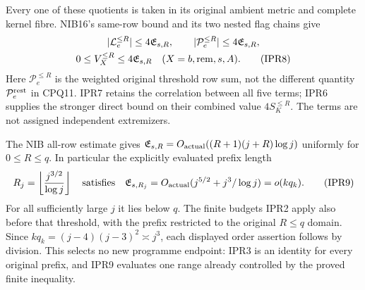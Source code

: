 \documentclass[11pt,a4paper]{article}
\begin{document}
Every one of these quotients is taken in its original ambient
metric and complete kernel fibre. NIB16's same-row bound and its
two nested flag chains give
\[
\begin{gathered}
 |\mathcal L_e^{\le R}|\le4\mathfrak E_{s,R},\qquad
 |\mathcal P_e^{\le R}|\le4\mathfrak E_{s,R},\\
 0\le V_X^{\le R}\le4\mathfrak E_{s,R}
           \quad(X=b,{\rm rem},s,A).                   \tag{IPR8}
\end{gathered}
\]
Here $\mathcal P_e^{\le R}$ is the weighted original threshold
row sum, not the different quantity $\mathcal P_e^{\rm rest}$
in CPQ11. IPR7 retains the correlation between all five terms;
IPR6 supplies the stronger direct bound on their combined value
$4S_K^{\le R}$. The terms are not assigned independent extremizers.

The NIB all-row estimate gives
$\mathfrak E_{s,R}=O_{\rm actual}((R+1)(j+R)\log j)$
uniformly for $0\le R\le q$. In particular the explicitly
evaluated prefix length
\[
 R_j=\left\lfloor\frac{j^{3/2}}{\log j}\right\rfloor
 \quad\hbox{satisfies}\quad
 \mathfrak E_{s,R_j}
   =O_{\rm actual}(j^{5/2}+j^3/\log j)=o(kq_k).         \tag{IPR9}
\]
For all sufficiently large $j$ it lies below $q$. The finite
budgets IPR2 apply also before that threshold, with the prefix
restricted to the original $R\le q$ domain. Since
$kq_k=(j-4)(j-3)^2\asymp j^3$, each displayed order assertion
follows by division. This selects no new programme endpoint:
IPR3 is an identity for every original prefix, and IPR9 evaluates
one range already controlled by the proved finite inequality.
\end{document}
